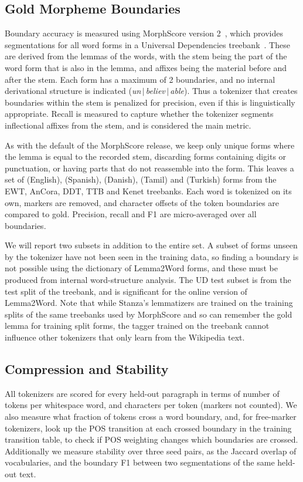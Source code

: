 \subsection{Gold Morpheme Boundaries}\label{sec:gold}
Boundary accuracy is measured using MorphScore version 2~\cite{arnett2025morphscore}, which provides segmentations for all word forms in a Universal Dependencies treebank~\cite{nivre2020ud}.
These are derived from the lemmas of the words, with the stem being the part of the word form that is also in the lemma, and affixes being the material before and after the stem.
Each form has a maximum of 2 boundaries, and no internal derivational structure is indicated (\emph{un}$\,|\,$\emph{believ}$\,|\,$\emph{able}).
Thus a tokenizer that creates boundaries within the stem is penalized for precision, even if this is linguistically appropriate.
Recall is measured to capture whether the tokenizer segments inflectional affixes from the stem, and is considered the main metric.

As with the default of the MorphScore release, we keep only unique forms where the lemma is equal to the recorded stem, discarding forms containing digits or punctuation, or having parts that do not reassemble into the form.
This leaves a set of \nMorphWordsEnglish{} (English), \nMorphWordsSpanish{} (Spanish), \nMorphWordsDanish{} (Danish), \nMorphWordsTamil{} (Tamil) and \nMorphWordsTurkish{} (Turkish) forms from the EWT, AnCora, DDT, TTB and Kenet treebanks.
Each word is tokenized on its own, markers are removed, and character offsets of the token boundaries are compared to gold.
Precision, recall and F1 are micro-averaged over all boundaries.

We will report two subsets in addition to the entire set.
A subset of forms unseen by the tokenizer have not been seen in the training data, so finding a boundary is not possible using the dictionary of Lemma2Word forms, and these must be produced from internal word-structure analysis.
The UD test subset is from the test split of the treebank, and is significant for the online version of Lemma2Word.
Note that while Stanza's lemmatizers are trained on the training splits of the same treebanks used by MorphScore and so can remember the gold lemma for training split forms, the tagger trained on the treebank cannot influence other tokenizers that only learn from the Wikipedia text.

\subsection{Compression and Stability}
All tokenizers are scored for every held-out paragraph in terms of number of tokens per whitespace word, and characters per token (markers not counted).
We also measure what fraction of tokens cross a word boundary, and, for free-marker tokenizers, look up the POS transition at each crossed boundary in the training transition table, to check if POS weighting changes which boundaries are crossed.
Additionally we measure stability over three seed pairs, as the Jaccard overlap of vocabularies, and the boundary F1 between two segmentations of the same held-out text.

